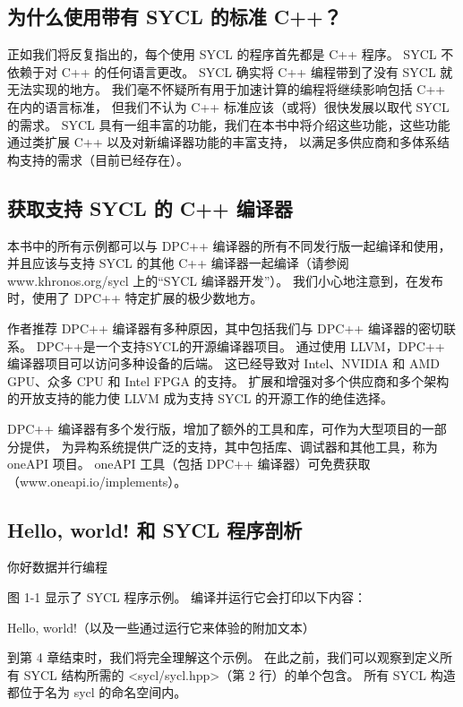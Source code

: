 \subsection{为什么使用带有 SYCL 的标准 C++？}
正如我们将反复指出的，每个使用 SYCL 的程序首先都是 C++ 程序。 SYCL 不依赖于对 C++ 的任何语言更改。 
SYCL 确实将 C++ 编程带到了没有 SYCL 就无法实现的地方。 
我们毫不怀疑所有用于加速计算的编程将继续影响包括 C++ 在内的语言标准，
但我们不认为 C++ 标准应该（或将）很快发展以取代 SYCL 的需求。 
SYCL 具有一组丰富的功能，我们在本书中将介绍这些功能，这些功能通过类扩展 C++ 以及对新编译器功能的丰富支持，
以满足多供应商和多体系结构支持的需求（目前已经存在）。

\subsection{获取支持 SYCL 的 C++ 编译器}
本书中的所有示例都可以与 DPC++ 编译器的所有不同发行版一起编译和使用，
并且应该与支持 SYCL 的其他 C++ 编译器一起编译（请参阅 www.khronos.org/sycl 上的“SYCL 编译器开发”）。 
我们小心地注意到，在发布时，使用了 DPC++ 特定扩展的极少数地方。

作者推荐 DPC++ 编译器有多种原因，其中包括我们与 DPC++ 编译器的密切联系。 DPC++是一个支持SYCL的开源编译器项目。 
通过使用 LLVM，DPC++ 编译器项目可以访问多种设备的后端。 
这已经导致对 Intel、NVIDIA 和 AMD GPU、众多 CPU 和 Intel FPGA 的支持。 
扩展和增强对多个供应商和多个架构的开放支持的能力使 LLVM 成为支持 SYCL 的开源工作的绝佳选择。

DPC++ 编译器有多个发行版，增加了额外的工具和库，可作为大型项目的一部分提供，
为异构系统提供广泛的支持，其中包括库、调试器和其他工具，称为 oneAPI 项目。 
oneAPI 工具（包括 DPC++ 编译器）可免费获取（www.oneapi.io/implements）。

\subsection{Hello, world! 和 SYCL 程序剖析}
{\color{red} 你好数据并行编程}

图 1-1 显示了 SYCL 程序示例。 编译并运行它会打印以下内容：

Hello, world!（以及一些通过运行它来体验的附加文本）

到第 4 章结束时，我们将完全理解这个示例。
在此之前，我们可以观察到定义所有 SYCL 结构所需的 <sycl/sycl.hpp>（第 2 行）的单个包含。 
所有 SYCL 构造都位于名为 sycl 的命名空间内。

